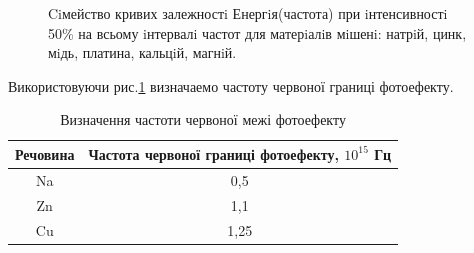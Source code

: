 \documentclass[a4paper,14pt]{extreport}
\begin{document}
	\begin{figure}[h!]
		\caption{Ciмейство кривих залежностi Енергiя(частота) при iнтенсивностi 50\% на всьому iнтервалi частот для матерiалiв мiшенi: натрiй, цинк, мiдь, платина, кальцiй, магнiй.}
		\label{ris1}
	\end{figure}
	\begin{center}
	\end{center}
	Використовуючи  рис.\ref{ris1} визначаемо частоту червоної границі фотоефекту.
	\begin{table}[h!]
		\begin{center}
			\caption{Визначення частоти червоної межі фотоефекту}
			\begin{tabular}{|c|c|}
			\hline
			\textbf{Речовина} & \textbf{Частота червоної границі фотоефекту, $10^{15}$ Гц} \\ \hline
			Na                & 0,5                        \\ \hline
			Zn                & 1,1                          \\ \hline
			Cu                & 1,25                        \\ \hline
			\end{tabular}
			\label{tab2}
		\end{center}
	\end{table}

	\clearpage
	\begin{center}
	\end{center}
\end{document}
